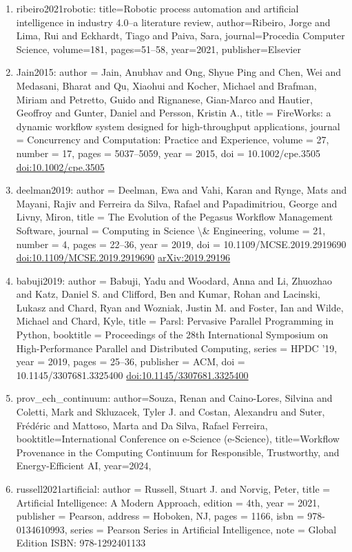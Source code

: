 \documentclass[11pt]{article}
\begin{document}
\begin{enumerate}[leftmargin=*]
  \item ribeiro2021robotic: title=Robotic process automation and artificial intelligence in industry 4.0--a literature review, author=Ribeiro, Jorge and Lima, Rui and Eckhardt, Tiago and Paiva, Sara, journal=Procedia Computer Science, volume=181, pages=51--58, year=2021, publisher=Elsevier
  \item Jain2015: author = Jain, Anubhav and Ong, Shyue Ping and Chen, Wei and Medasani, Bharat and Qu, Xiaohui and Kocher, Michael and Brafman, Miriam and Petretto, Guido and Rignanese, Gian-Marco and Hautier, Geoffroy and Gunter, Daniel and Persson, Kristin A., title = FireWorks: a dynamic workflow system designed for high-throughput applications, journal = Concurrency and Computation: Practice and Experience, volume = 27, number = 17, pages = 5037--5059, year = 2015, doi = 10.1002/cpe.3505 \href{https://doi.org/10.1002/cpe.3505}{doi:10.1002/cpe.3505}
  \item deelman2019: author = Deelman, Ewa and Vahi, Karan and Rynge, Mats and Mayani, Rajiv and Ferreira da Silva, Rafael and Papadimitriou, George and Livny, Miron, title = The Evolution of the Pegasus Workflow Management Software, journal = Computing in Science \textbackslash{}\& Engineering, volume = 21, number = 4, pages = 22--36, year = 2019, doi = 10.1109/MCSE.2019.2919690 \href{https://doi.org/10.1109/MCSE.2019.2919690}{doi:10.1109/MCSE.2019.2919690} \href{https://arxiv.org/abs/2019.29196}{arXiv:2019.29196}
  \item babuji2019: author = Babuji, Yadu and Woodard, Anna and Li, Zhuozhao and Katz, Daniel S. and Clifford, Ben and Kumar, Rohan and Lacinski, Lukasz and Chard, Ryan and Wozniak, Justin M. and Foster, Ian and Wilde, Michael and Chard, Kyle, title = Parsl: Pervasive Parallel Programming in Python, booktitle = Proceedings of the 28th International Symposium on High-Performance Parallel and Distributed Computing, series = HPDC '19, year = 2019, pages = 25--36, publisher = ACM, doi = 10.1145/3307681.3325400 \href{https://doi.org/10.1145/3307681.3325400}{doi:10.1145/3307681.3325400}
  \item prov\_ech\_continuum: author=Souza, Renan and Caino-Lores, Silvina and Coletti, Mark and Skluzacek, Tyler J. and Costan, Alexandru and Suter, Frédéric and Mattoso, Marta and Da Silva, Rafael Ferreira, booktitle=International Conference on e-Science (e-Science), title=Workflow Provenance in the Computing Continuum for Responsible, Trustworthy, and Energy-Efficient AI, year=2024,
  \item russell2021artificial: author = Russell, Stuart J. and Norvig, Peter, title = Artificial Intelligence: A Modern Approach, edition = 4th, year = 2021, publisher = Pearson, address = Hoboken, NJ, pages = 1166, isbn = 978-0134610993, series = Pearson Series in Artificial Intelligence, note = Global Edition ISBN: 978-1292401133

\end{enumerate}
\end{document}
